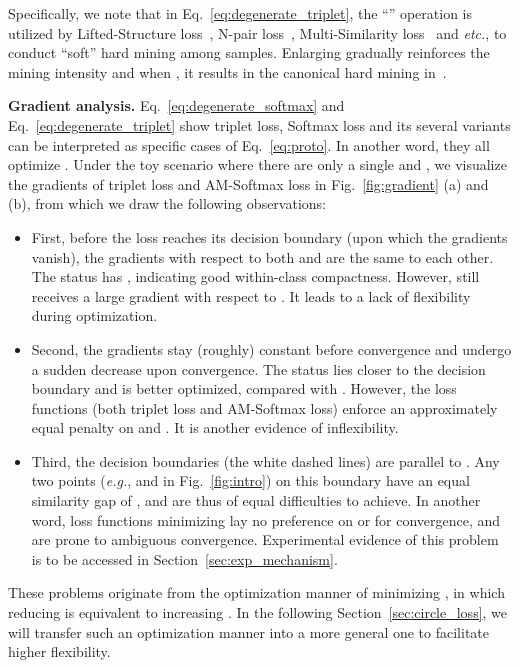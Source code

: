\documentclass[10pt,twocolumn,letterpaper]{article}
\begin{document}
Specifically, we note that in Eq.~\ref{eq:degenerate_triplet}, the ``'' operation is utilized by Lifted-Structure loss~\cite{oh2016deep}, N-pair loss~\cite{Sohn2016ImprovedDM}, Multi-Similarity loss~\cite{wang2019multi} and \emph{etc.}, to conduct ``soft'' hard mining among samples. Enlarging  gradually reinforces the mining intensity and when , it results in the canonical hard mining in~\cite{schroff2015facenet, hermans2017defense}.

\textbf{Gradient analysis.} 
Eq.~\ref{eq:degenerate_softmax} and Eq.~\ref{eq:degenerate_triplet} show triplet loss, Softmax loss and its several variants can be interpreted as specific cases of Eq.~\ref{eq:proto}. In another word, they all optimize . Under the toy scenario where there are only a single  and , we visualize the gradients of triplet loss and AM-Softmax loss in Fig.~\ref{fig:gradient} (a) and (b), from which we draw the following observations:
\begin{itemize}
\item First, before the loss reaches its decision boundary (upon which the gradients vanish), the gradients with respect to both  and  are the same to each other. The status  has , indicating good within-class compactness. However,  still receives a large gradient with respect to .
It leads to a lack of flexibility during optimization. 

\item Second, the gradients stay (roughly) constant before convergence and undergo a sudden decrease upon convergence. The status  lies closer to the decision boundary and is better optimized, compared with . However, the loss functions (both triplet loss and AM-Softmax loss) enforce an approximately equal penalty on  and . It is another evidence of inflexibility. 

\item Third, the decision boundaries (the white dashed lines) are parallel to . Any two points (\emph{e.g.},  and  in Fig.~\ref{fig:intro}) on this boundary have an equal similarity gap of , and are thus of equal difficulties to achieve. In another word, loss functions minimizing  lay no preference on  or  for convergence, and are prone to ambiguous convergence. Experimental evidence of this problem is to be accessed in Section~\ref{sec:exp_mechanism}.
\end{itemize}

These problems originate from the optimization manner of minimizing , in which reducing  is equivalent to increasing . In the following Section~\ref{sec:circle_loss}, we will transfer such an optimization manner into a more general one to facilitate higher flexibility. 
\end{document}
